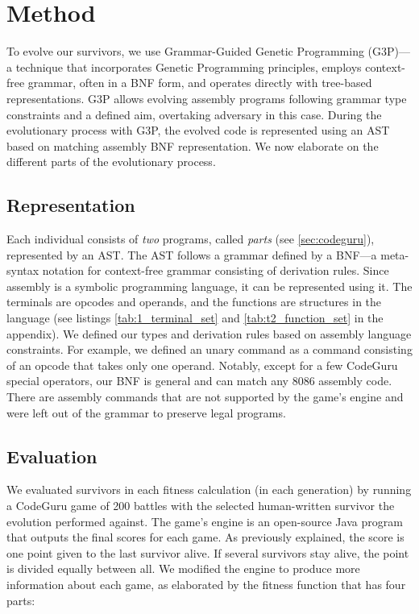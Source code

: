 \documentclass[dvipsnames, format=sigconf]{acmart}
\begin{document}
\section{Method}
To evolve our survivors, we use Grammar-Guided Genetic Programming (G3P)---a technique that incorporates Genetic Programming principles, employs context-free grammar, often in a BNF form, and operates directly with tree-based representations. G3P allows evolving assembly programs following grammar type constraints and a defined aim, overtaking adversary in this case. During the evolutionary process with G3P, the evolved code is represented using an AST based on matching assembly BNF representation. 
We now elaborate on the different parts of the evolutionary process.

\subsection{Representation}
Each individual consists of \textit{two} programs, called \textit{parts} (see \autoref{sec:codeguru}), represented by an AST. The AST follows a grammar defined by a BNF---a meta-syntax notation for context-free grammar consisting of derivation rules. Since assembly is a symbolic programming language, it can be represented using it. The terminals are opcodes and operands, and the functions are structures in the language (see listings \ref{tab:1_terminal_set} and \ref{tab:t2_function_set} in the appendix). We defined our types and derivation rules based on assembly language constraints. For example, we defined an unary command as a command consisting of an opcode that takes only one operand. Notably, except for a few CodeGuru special operators, our BNF is general and can match any 8086 assembly code. There are assembly commands that are not supported by the game's engine and were left out of the grammar to preserve legal programs.

\subsection{Evaluation}
We evaluated survivors in each fitness calculation (in each generation) by running a CodeGuru game of 200 battles with the selected human-written survivor the evolution performed against. The game's engine is an open-source Java program that outputs the final scores for each game. As previously explained, the score is one point given to the last survivor alive. If several survivors stay alive, the point is divided equally between all. We modified the engine to produce more information about each game, as elaborated by the fitness function that has four parts:
\end{document}
